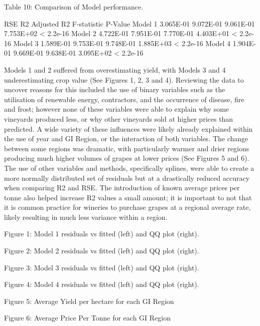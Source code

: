\documentclass[
  journal=large,
  manuscript=article-type,
  year=2023,
  volume=?,
]{cup-journal}
\begin{document}
Table 10: Comparison of Model performance.

RSE
R2
Adjusted R2
F-statistic
P-Value
Model 1
3.065E-01
9.072E-01
9.061E-01
7.753E+02
< 2.2e-16
Model 2
4.722E-01
7.951E-01
7.770E-01
4.403E+01
< 2.2e-16
Model 3
1.589E-01
9.753E-01
9.748E-01
1.885E+03
< 2.2e-16
Model 4
1.904E-01
9.669E-01
9.638E-01
3.095E+02
< 2.2e-16

Models 1 and 2 suffered from overestimating yield, with Models 3 and 4 underestimating crop value (See Figures 1, 2, 3 and 4). Reviewing the data to uncover reasons for this included the use of binary variables such as the utilisation of renewable energy, contractors, and the occurrence of disease, fire and frost; however none of these variables were able to explain why some vineyards produced less, or why other vineyards sold at higher prices than predicted. A wide variety of these influences were likely already explained within the use of year and GI Region, or the interaction of both variables. The change between some regions was dramatic, with particularly warmer and drier regions producing much higher volumes of grapes at lower prices (See Figures 5 and 6). The use of other variables and methods, specifically splines, were able to create a more normally distributed set of residuals but at a drastically reduced accuracy when comparing R2 and RSE. The introduction of known average prices per tonne also helped increase R2 values a small amount; it is important to not that it is common practice for wineries to purchase grapes at a regional average rate, likely resulting in much less variance within a region.

Figure 1: Model 1 residuals vs fitted (left) and QQ plot (right). 





Figure 2:  Model 2 residuals vs fitted (left) and QQ plot (right). 



Figure 3:  Model 3 residuals vs fitted (left) and QQ plot (right). 




Figure 4:  Model 4 residuals vs fitted (left) and QQ plot (right). 




Figure 5: Average Yield per hectare for each GI Region


Figure 6: Average Price Per Tonne for each GI Region
\end{document}
